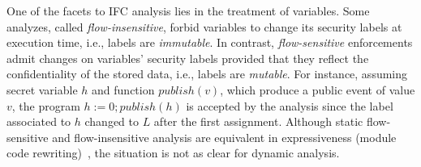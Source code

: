 One of the facets to IFC analysis lies in the treatment of variables. Some
analyzes, called \emph{flow-insensitive}, forbid variables to change its
security labels at execution time, i.e., labels are \emph{immutable}. In
contrast, \emph{flow-sensitive} enforcements admit changes on variables'
security labels provided that they reflect the confidentiality of the stored
data, i.e., labels are \emph{mutable}. For instance, assuming secret variable
$h$ and function $\mathit{publish}(v)$, which produce a public event of value
$v$, the program $h := 0 ; \mathit{publish}(h)$ is accepted by the analysis
since the label associated to $h$ changed to $L$ after the first
assignment. Although static flow-sensitive and flow-insensitive analysis are
equivalent in expressiveness (module code rewriting)~\citep{Hunt:2006}, the 
situation is not as clear for  dynamic analysis.












